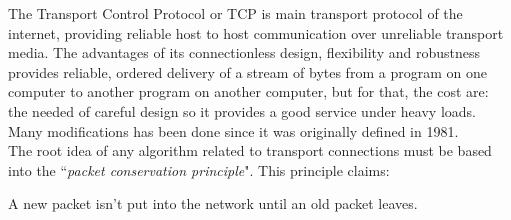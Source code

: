 
The Transport Control Protocol or TCP is main transport protocol of the
internet, providing reliable host to host communication over unreliable
transport media\cite{RFC793}. The advantages of its connectionless design,
flexibility and robustness provides reliable, ordered delivery of a stream of
bytes from a program on one computer to another program on another computer,
but for that, the cost are: the needed of careful design so it provides a good
service under heavy loads. Many modifications has been done since it was
originally defined in 1981.\\

The root idea of any algorithm related to transport connections must be based
into the ``\textit{packet conservation principle}". This principle claims:

\begin{defn}
A new packet isn't put into the network until an old packet leaves.
\end{defn}
